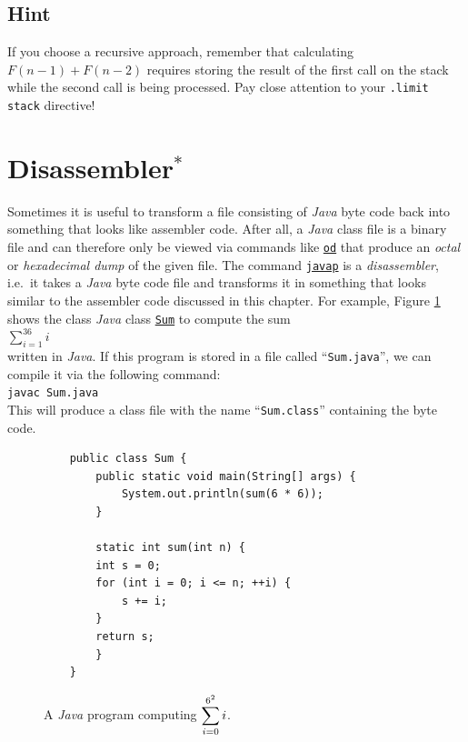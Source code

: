 \subsection*{Hint}
If you choose a recursive approach, remember that calculating $F(n-1) + F(n-2)$ requires storing the result of the first call on the stack while the second call is being processed. Pay close attention to your \texttt{.limit stack} directive!

\section{Disassembler$^*$}
Sometimes it is useful to transform a file consisting of \textsl{Java} byte code back into something
that looks like assembler code.  After all, a \textsl{Java} class file is a binary file and can
therefore only be viewed via commands like \href{http://en.wikipedia.org/wiki/Od_(Unix)}{\texttt{od}} 
that produce an \emph{octal} or \emph{hexadecimal dump} of the given file.  The command
\href{http://docs.oracle.com/javase/7/docs/technotes/tools/windows/javap.html}{\texttt{javap}} 
is a \emph{disassembler},  i.e.~it takes a \textsl{Java} byte code file and transforms it in
something that looks similar to the assembler code discussed in this chapter.  For example, Figure \ref{fig:Sum.java}
shows the class \textsl{Java} class
\href{https://github.com/karlstroetmann/Formal-Languages/tree/master/Python/Chapter-12/Sum.java}{\texttt{Sum}}
 to compute the sum 
\\[0.2cm]
\hspace*{1.3cm}
$\sum\limits_{i=1}^{36} i$
\\[0.2cm]
written in \textsl{Java}.  If this program is
stored in a file called ``\texttt{Sum.java}'', we can compile it via the following command:
\\[0.2cm]
\hspace*{1.3cm}
\texttt{javac Sum.java}
\\[0.2cm]
This will produce a class file with the name ``\texttt{Sum.class}'' containing the byte code.

\begin{figure}[!ht]
\centering
  \begin{verbatim}
    public class Sum {
        public static void main(String[] args) {
            System.out.println(sum(6 * 6));
        }
    
        static int sum(int n) {
    	int s = 0;
    	for (int i = 0; i <= n; ++i) {
    	    s += i;
    	}
    	return s;
        }
    }
\end{verbatim}
\vspace*{-0.3cm}
\caption{A \textsl{Java} program computing $\displaystyle\sum\limits_{i=0}^{6^2} i$.}
\label{fig:Sum.java}
\end{figure}

